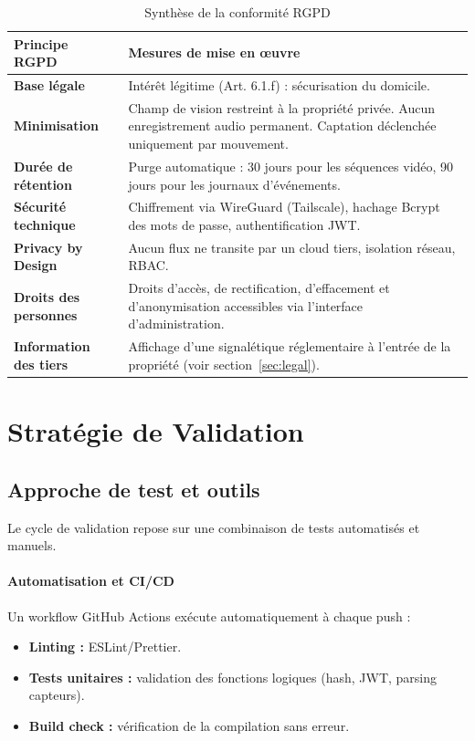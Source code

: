 \documentclass[12pt,a4paper]{article}
\begin{document}
\begin{table}[H]
\centering
\renewcommand{\arraystretch}{1.3}
\small
\begin{tabular}{|l|p{9.5cm}|}
\hline
\textbf{Principe RGPD} & \textbf{Mesures de mise en œuvre} \\
\hline
\textbf{Base légale} & Intérêt légitime (Art. 6.1.f) : sécurisation du domicile. \\
\hline
\textbf{Minimisation} & Champ de vision restreint à la propriété privée. Aucun enregistrement audio permanent. Captation déclenchée uniquement par mouvement. \\
\hline
\textbf{Durée de rétention} & Purge automatique : 30 jours pour les séquences vidéo, 90 jours pour les journaux d'événements. \\
\hline
\textbf{Sécurité technique} & Chiffrement via WireGuard (Tailscale), hachage Bcrypt des mots de passe, authentification JWT. \\
\hline
\textbf{Privacy by Design} & Aucun flux ne transite par un cloud tiers, isolation réseau, RBAC. \\
\hline
\textbf{Droits des personnes} & Droits d'accès, de rectification, d'effacement et d'anonymisation accessibles via l'interface d'administration. \\
\hline
\textbf{Information des tiers} & Affichage d'une signalétique réglementaire à l'entrée de la propriété (voir section~\ref{sec:legal}). \\
\hline
\end{tabular}
\caption{Synthèse de la conformité RGPD}
\end{table}

\section{Stratégie de Validation}

\subsection{Approche de test et outils}

Le cycle de validation repose sur une combinaison de tests automatisés et manuels.

\paragraph{Automatisation et CI/CD}
Un workflow GitHub Actions exécute automatiquement à chaque push :
\begin{itemize}
    \item \textbf{Linting :} ESLint/Prettier.
    \item \textbf{Tests unitaires :} validation des fonctions logiques (hash, JWT, parsing capteurs).
    \item \textbf{Build check :} vérification de la compilation sans erreur.
\end{itemize}
\end{document}
